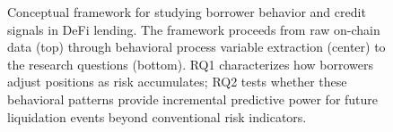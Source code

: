 \begin{figure}[t]
\caption{Conceptual framework for studying borrower behavior and credit signals in DeFi lending. The framework proceeds from raw on-chain data (top) through behavioral process variable extraction (center) to the research questions (bottom). RQ1 characterizes how borrowers adjust positions as risk accumulates; RQ2 tests whether these behavioral patterns provide incremental predictive power for future liquidation events beyond conventional risk indicators.}
\label{fig:framework}
\end{figure}


